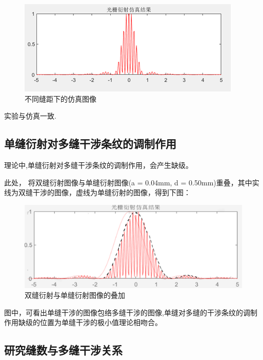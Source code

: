\documentclass[a4paper]{../phyreport}
\begin{document}
\begin{figure}[H]
  \begin{minipage}[b]{0.45\linewidth}
    \centering
\includegraphics[width=0.9\linewidth]{fig/仿真/0.080.50.png}
  \end{minipage}
  \caption{不同缝距下的仿真图像}
\end{figure}
实验与仿真一致.

\subsection{单缝衍射对多缝干涉条纹的调制作用}
理论中,单缝衍射对多缝干涉条纹的调制作用，会产生缺级。

此处，
将双缝衍射图像与单缝衍射图像(a = 0.04mm,  d = 0.50mm)重叠，其中实线为双缝干涉的图像，虚线为单缝衍射的图像，得到下图：
\begin{figure}[H]
  \centering
  \includegraphics[width=0.6\linewidth]{fig/仿真/组合.png}
  \caption{双缝衍射与单缝衍射图像的叠加}
\end{figure}

图中，可看出单缝干涉的图像包络多缝干涉的图像,单缝对多缝的干涉条纹的调制作用缺级的位置为单缝干涉的极小值理论相吻合。

\subsection{研究缝数与多缝干涉关系}
\end{document}
